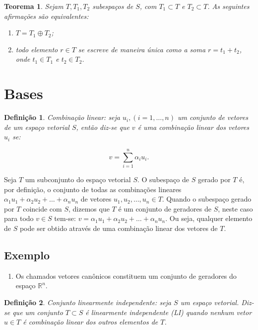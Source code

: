 \documentclass[a4paper,portuguese,9pt]{extarticle}
\newtheorem{theorem}{Teorema}[section]
\newtheorem*{definition}{Definição}
\begin{document}
\begin{multicols*}{2}
\begin{theorem}
Sejam $T, T_1, T_2$ subespaços de $S$, com $T_1 \subset T$ e $T_2 \subset T$. As seguintes afirmações são equivalentes:

\begin{enumerate}
    \item $T = T_1 \oplus T_2$;
    \item todo elemento $r \in T$ se escreve de maneira única como a soma $r = t_1 + t_2$, onde $t_1 \in T_1$ e $t_2 \in T_2$.
\end{enumerate}
\end{theorem}

\section{Bases}

\begin{definition}
Combinação linear: seja $u_i, (i= 1,\ldots , n)$ um conjunto de vetores de um espaço vetorial $S$, então diz-se que $v$ é uma combinação linear dos vetores $u_i$ se:

\begin{displaymath}
v = \sum_{i=1}^{n} \alpha_i u_i.
\end{displaymath}
\end{definition}

Seja $T$ um subconjunto do espaço vetorial $S$. O subespaço de $S$ gerado por $T$ é, por definição, o conjunto de todas as combinações lineares $\alpha_1 u_1 + \alpha_2 u_2 + \ldots + \alpha_n u_n$ de vetores $u_1, u_2, \ldots, u_n \in T$. Quando o subespaço gerado por $T$ coincide com $S$, dizemos que $T$ é um conjunto de geradores de $S$, neste caso para todo $v \in S$ tem-se: $v = \alpha_1 u_1 + \alpha_2 u_2 + \ldots + \alpha_n u_n$. Ou seja, qualquer elemento de $S$ pode ser obtido através de uma combinação linear dos vetores de $T$.

\subsection{Exemplo}\begin{enumerate}
    \item Os chamados vetores canônicos constituem um conjunto de geradores do espaço $\mathbb{R}^n$.
\end{enumerate}

\begin{definition}
Conjunto linearmente independente: seja $S$ um espaço vetorial. Diz-se que um conjunto $T \subset S$ é linearmente independente (LI) quando nenhum vetor $u \in T$ é combinação linear dos outros elementos de $T$.
\end{definition}


\end{multicols*}
\end{document}
